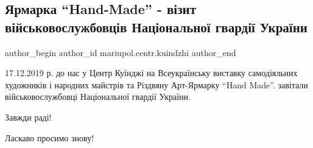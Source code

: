 
 
 
 
 

\subsection{Ярмарка \enquote{Hand-Made} - візит військовослужбовців Національної гвардії України}
\label{sec:17_12_2019.fb.mariupol.centr.kuindzhi.1.jarmarka_handmade_vizyt_nacgvardia_ukrainy}

\ifcmt
 author_begin
   author_id mariupol.centr.kuindzhi
 author_end
\fi

\vspace{0.5cm}
\begin{minipage}{0.9\textwidth}
17.12.2019 р. до нас у Центр Куїнджі на Всеукраїнську виставку самодіяльних
художників і народних майстрів та Різдвяну Арт-Ярмарку \enquote{Hand Made}.
завітали військовослужбовці Національної гвардії України.

Завжди раді!

Ласкаво просимо знову!
\end{minipage}
\vspace{0.5cm}
